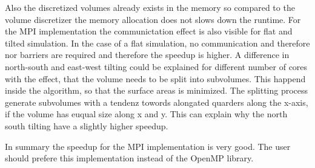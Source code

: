Also the discretized volumes already exists in the memory so compared to the volume discretizer the memory allocation does not slows down the runtime.
For the \ac{MPI} implementation the communictation effect is also visible for flat and tilted simulation.
In the case of a flat simulation, no communication and therefore nor barriers are required and therefore the speedup is higher.
A difference in north-south and east-west tilting could be explained for different number of cores with the effect, that the volume needs to be split into subvolumes.
This happend inside the algorithm, so that the surface areas is minimized.
The splitting process generate subvolumes with a tendenz towords alongated quarders along the x-axis, if the volume has euqual size along x and y.
This can explain why the north south tilting have a slightly higher speedup.
\par
%
In summary the speedup for the \ac{MPI} implementation is very good.
The user should prefere this implementation instead of the \ac{OpenMP} library.